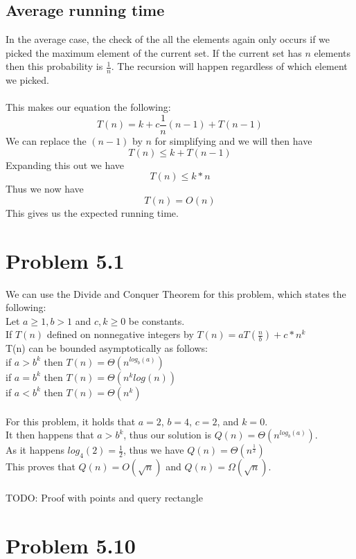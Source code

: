 \documentclass[11pt,psfig]{article}
\begin{document}
\subsection*{Average running time}

In the average case, the check of the all the elements again only occurs if we picked the maximum element of the current set. If the current set has $n$ elements then this probability is $\frac{1}{n}$. The recursion will happen regardless of which element we picked. \\
\\
This makes our equation the following:
\[
T(n) = k + c\frac{1}{n}(n-1) + T(n-1)
\]
We can replace the $(n-1)$ by $n$ for simplifying and we will then have
\[
T(n) \leq k + T(n-1)
\]
Expanding this out we have
\[
T(n) \leq k*n
\]
Thus we now have
\[
T(n) = O(n)
\]
This gives us the expected running time. 

\newpage

\section*{Problem 5.1}

We can use the Divide and Conquer Theorem for this problem, which states the following:\\
Let $a \geq 1, b>1$ and $c,k \geq 0$ be constants. \\
If $T(n)$ defined on nonnegative integers by $T(n) = a T(\frac{n}{b}) + c*n^k$\\
T(n) can be bounded asymptotically as follows:\\
if $a > b^k$ then $T(n) = \Theta( n^{log_b(a)} )$\\
if $a = b^k$ then $T(n) = \Theta( n^k log(n) )$\\
if $a < b^k$ then $T(n) = \Theta( n^k )$\\
\\
For this problem, it holds that $a=2$, $b=4$, $c=2$, and $k=0$. \\
It then happens that $a > b^k$, thus our solution is $Q(n) = \Theta( n^{log_b(a)} )$.\\
As it happens $log_4(2)=\frac{1}{2}$, thus we have $Q(n) = \Theta(n^{\frac{1}{2}})$\\
This proves that $Q(n)=O(\sqrt{n})$ and $Q(n)=\Omega(\sqrt{n})$.\\
\\
TODO: Proof with points and query rectangle

\section*{Problem 5.10}
 



\end{document}
